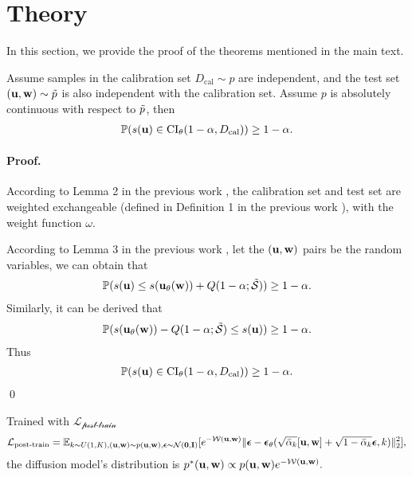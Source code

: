 
\section{Theory}
\label{app:theory}

In this section, we provide the proof of the theorems mentioned in the main text.

\begin{theorem}
     Assume samples in the calibration set $D_\textrm{cal}\sim p$ are independent, and the test set $(\mathbf{u},\mathbf{w})\sim \Tilde{p}$ is also independent with the calibration set. Assume $p$ is absolutely continuous with respect to $\Tilde{p}$, then
     \begin{align}
         \mathbb{P}(s(\mathbf{u})\in\textrm{CI}_\theta(1-\alpha,D_\textrm{cal})) \geq 1-\alpha.
     \end{align}
\end{theorem}

\paragraph{Proof.} According to Lemma 2 in the previous work \citep{Tibshirani2019ConformalPU}, the calibration set and test set are weighted exchangeable (defined in Definition 1 in the previous work \citep{Tibshirani2019ConformalPU}), with the weight function $\omega$.

According to Lemma 3 in the previous work \citep{Tibshirani2019ConformalPU}, let the $(\mathbf{u},\mathbf{w})$ pairs be the random variables, we can obtain that 
\begin{align}
 \mathbb{P}(s(\mathbf{u})\leq s(\mathbf{u}_\theta(\mathbf{w}))+Q(1-\alpha;\Tilde{\mathcal{S}})) \geq 1-\alpha.
\end{align}
Similarly, it can be derived that
\begin{align}
 \mathbb{P}(s(\mathbf{u}_\theta(\mathbf{w}))-Q(1-\alpha;\Tilde{\mathcal{S}})\leq s(\mathbf{u})) \geq 1-\alpha.
\end{align}
Thus      
\begin{align}
    \mathbb{P}(s(\mathbf{u})\in\textrm{CI}_\theta(1-\alpha,D_\textrm{cal})) \geq 1-\alpha.
\end{align} \qed

\begin{theorem}
    Trained with $\mathcal{L_\textrm{post-train}}$
    \begin{align}
    \mathcal{L_\textrm{post-train}}=\mathbb{E}_{k\sim U(1,K),(\mathbf{u},\mathbf{w})\sim p(\mathbf{u},\mathbf{w}),\bm{\epsilon}\sim \mathcal{N}(\mathbf{0},\mathbf{I})}
    [e^{-\mathcal{W}(\mathbf{u},\mathbf{w})}\|\mathbf{\bm{\epsilon}} - \bm{\epsilon}_\theta(\sqrt{\bar{\alpha}_k}[\mathbf{u},\mathbf{w}] + \sqrt{1-\bar{\alpha}_k} \bm{\epsilon},k)\|_2^2],
    \end{align}
    the diffusion model's distribution is $p^*(\mathbf{u},\mathbf{w})\propto p(\mathbf{u},\mathbf{w}) e^{-\mathcal{W}(\mathbf{u},\mathbf{w})}.$
\end{theorem}

